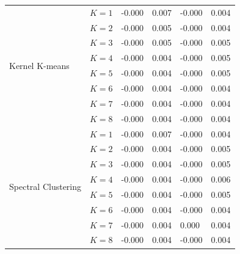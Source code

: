 \begin{table}[!t]
\begin{tabular}{l|c|ll|ll}
    \midrule
    \multirow[t]{8}{*}{Kernel K-means} 
      & $K=1$ & -0.000 & 0.007 & -0.000 & 0.004 \\
      & $K=2$ & -0.000 & 0.005 & -0.000 & 0.004 \\
      & $K=3$ & -0.000 & 0.005 & -0.000 & 0.005 \\
      & $K=4$ & -0.000 & 0.004 & -0.000 & 0.005 \\
      & $K=5$ & -0.000 & 0.004 & -0.000 & 0.005 \\
      & $K=6$ & -0.000 & 0.004 & -0.000 & 0.004 \\
      & $K=7$ & -0.000 & 0.004 & -0.000 & 0.004 \\
      & $K=8$ & -0.000 & 0.004 & -0.000 & 0.004 \\
    \midrule
    \multirow[t]{8}{*}{Spectral Clustering} 
      & $K=1$ & -0.000 & 0.007 & -0.000 & 0.004 \\
      & $K=2$ & -0.000 & 0.004 & -0.000 & 0.005 \\
      & $K=3$ & -0.000 & 0.004 & -0.000 & 0.005 \\
      & $K=4$ & -0.000 & 0.004 & -0.000 & 0.006 \\
      & $K=5$ & -0.000 & 0.004 & -0.000 & 0.005 \\
      & $K=6$ & -0.000 & 0.004 & -0.000 & 0.004 \\
      & $K=7$ & -0.000 & 0.004 &  0.000 & 0.004 \\
      & $K=8$ & -0.000 & 0.004 & -0.000 & 0.004 \\
    \midrule
    \end{tabular}
\end{table}

